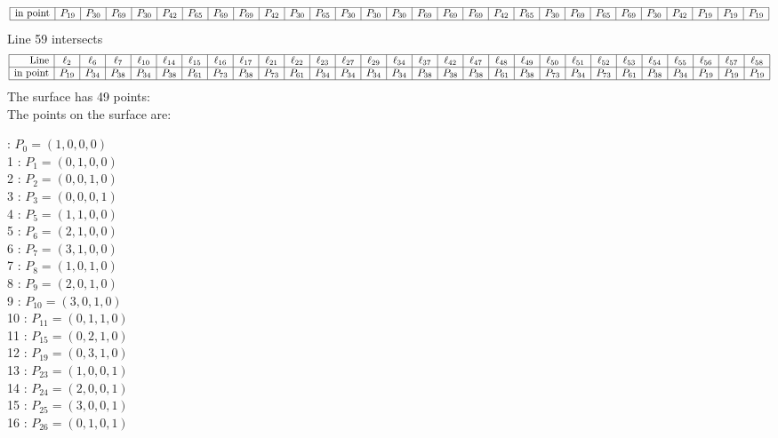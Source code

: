 \documentclass{article}
\begin{document}
{$$\begin{array}{|r*{28}{|c}|}
\hline
\mbox{in point}  & P_{19} & P_{30} & P_{69} & P_{30} & P_{42} & P_{65} & P_{69} & P_{69} & P_{42} & P_{30} & P_{65} & P_{30} & P_{30} & P_{30} & P_{69} & P_{69} & P_{69} & P_{42} & P_{65} & P_{30} & P_{69} & P_{65} & P_{69} & P_{30} & P_{42} & P_{19} & P_{19} & P_{19}\\
\hline
\end{array}
$$
Line 59 intersects 
$$
\begin{array}{|r*{28}{|c}|}
\hline
\mbox{Line}  & \ell_{2} & \ell_{6} & \ell_{7} & \ell_{10} & \ell_{14} & \ell_{15} & \ell_{16} & \ell_{17} & \ell_{21} & \ell_{22} & \ell_{23} & \ell_{27} & \ell_{29} & \ell_{34} & \ell_{37} & \ell_{42} & \ell_{47} & \ell_{48} & \ell_{49} & \ell_{50} & \ell_{51} & \ell_{52} & \ell_{53} & \ell_{54} & \ell_{55} & \ell_{56} & \ell_{57} & \ell_{58}\\
\hline
\mbox{in point}  & P_{19} & P_{34} & P_{38} & P_{34} & P_{38} & P_{61} & P_{73} & P_{38} & P_{73} & P_{61} & P_{34} & P_{34} & P_{34} & P_{34} & P_{38} & P_{38} & P_{38} & P_{61} & P_{38} & P_{73} & P_{34} & P_{73} & P_{61} & P_{38} & P_{34} & P_{19} & P_{19} & P_{19}\\
\hline
\end{array}
$$
The surface has 49 points:\\
The points on the surface are:\\
\begin{multicols}{3}
 : $P_{0}=( 1, 0, 0, 0 )$\\
1 : $P_{1}=( 0, 1, 0, 0 )$\\
2 : $P_{2}=( 0, 0, 1, 0 )$\\
3 : $P_{3}=( 0, 0, 0, 1 )$\\
4 : $P_{5}=( 1, 1, 0, 0 )$\\
5 : $P_{6}=( 2, 1, 0, 0 )$\\
6 : $P_{7}=( 3, 1, 0, 0 )$\\
7 : $P_{8}=( 1, 0, 1, 0 )$\\
8 : $P_{9}=( 2, 0, 1, 0 )$\\
9 : $P_{10}=( 3, 0, 1, 0 )$\\
10 : $P_{11}=( 0, 1, 1, 0 )$\\
11 : $P_{15}=( 0, 2, 1, 0 )$\\
12 : $P_{19}=( 0, 3, 1, 0 )$\\
13 : $P_{23}=( 1, 0, 0, 1 )$\\
14 : $P_{24}=( 2, 0, 0, 1 )$\\
15 : $P_{25}=( 3, 0, 0, 1 )$\\
16 : $P_{26}=( 0, 1, 0, 1 )$\\

\end{multicols}}
\end{document}
